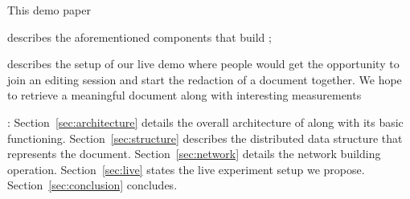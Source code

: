 
This demo paper
\begin{inparaenum}[(i)]
\item describes the aforementioned components that build \CRATE;
\item describes the setup of our live demo where people would get the
  opportunity to join an editing session and start the redaction of a document
  together. We hope to retrieve a meaningful document along with interesting
  measurements 
\end{inparaenum}

:
Section~\ref{sec:architecture} details the overall architecture of \CRATE along
with its basic functioning. Section~\ref{sec:structure} describes the
distributed data structure that represents the
document. Section~\ref{sec:network} details the network building
operation. Section~\ref{sec:live} states the live experiment setup we
propose. Section~\ref{sec:conclusion} concludes.


